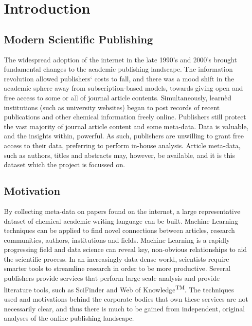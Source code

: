 \chapter{Introduction}
\section{Modern Scientific Publishing}
The widespread adoption of the internet in the late 1990’s and 2000’s brought  fundamental changes to the academic publishing landscape. The information revolution allowed publishers` costs to fall, and there was a mood shift in the academic sphere away from subscription-based models, towards giving open and free access to some or all of journal article contents.
Simultaneously, learn\`{e}d institutions (such as university websites) began to post records of recent publications and other chemical information freely online. 
Publishers still protect the vast majority of journal article content and some meta-data. Data is valuable, and the insights within, powerful. As such, publishers are unwilling to grant free access to their data, preferring to perform in-house analysis. Article meta-data, such as authors, titles and abstracts may, however, be available, and it is this dataset which the project is focussed on. 
\section{Motivation}
By collecting meta-data on papers found on the internet, a large representative dataset of chemical academic writing language can be built. Machine Learning techniques can be applied to find novel connections between articles, research communities, authors, institutions and fields. Machine Learning is a rapidly progressing field and data science can reveal key, non-obvious relationships to aid the scientific process. In an increasingly data-dense world, scientists require smarter tools to streamline research in order to be more productive. Several publishers provide services that perform large-scale analysis and provide literature tools, such as SciFinder\textsuperscript{\textregistered} and Web of Knowledge\textsuperscript{TM}. The techniques used and motivations behind the corporate bodies that own these services are not necessarily clear, and thus there is much to be gained from independent, original analyses of the online publishing landscape. 
